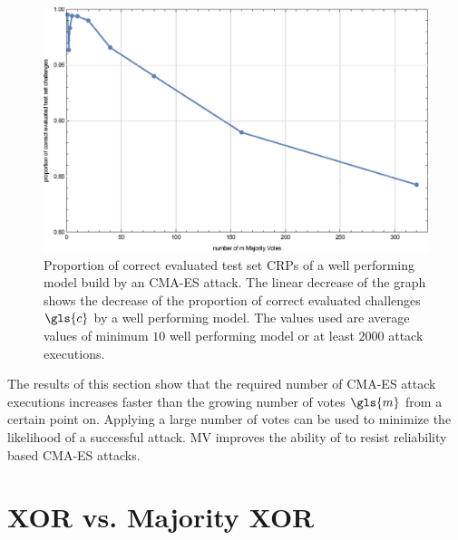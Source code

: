 \begin{figure}[ht]
\includegraphics[width=1.00\textwidth]{images/single-mv-classification-cma-attack-correctness.eps}
\caption[Proportion of correct evaluated test set challenges of a model approximated by the \acs{CMA-ES} attack]{Proportion of correct evaluated test set \acp{CRP} of a well performing model build by an \ac{CMA-ES} attack. The linear decrease of the graph shows the decrease of the proportion of correct evaluated challenges $\gls{c}$ by a well performing model. The values used are average values of minimum $10$ well performing model or at least $2000$ attack executions.}
\label{fig:cmasingleattackcorrectness}
\end{figure}

The results of this section show that the required number of \ac{CMA-ES} attack executions increases faster than the growing number of votes $\gls{m}$ from a certain point on.
Applying a large number of votes can be used to minimize the likelihood of a successful attack.
\ac{MV} improves the ability of \apufs to resist reliability based \ac{CMA-ES} attacks.


\section{\acs{XOR} \apufs vs. Majority \acs{XOR} \apufs}
\label{sec:xorarbitervsmajorityxorarbiter}


